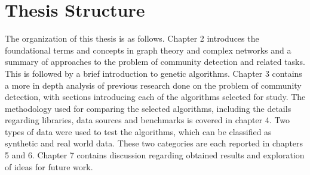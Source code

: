 \section{Thesis Structure}

The organization of this thesis is as follows. Chapter 2 introduces the foundational terms and concepts in graph theory and complex networks and a summary of approaches to the problem of community detection and related tasks. This is followed by a brief introduction to genetic algorithms. Chapter 3 contains a more in depth analysis of previous research done on the problem of community detection, with sections introducing each of the algorithms selected for study. The methodology used for comparing the selected algorithms, including the details regarding libraries, data sources and benchmarks is covered in chapter 4. Two types of data were used to test the algorithms, which can be classified as synthetic and real world data. These two categories are each reported in chapters 5 and 6. Chapter 7 contains discussion regarding obtained results and exploration of ideas for future work.